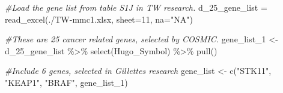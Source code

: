 \documentclass[
]{article}
\newenvironment{Shaded}{\begin{snugshade}}{\end{snugshade}}
\newcommand{\AttributeTok}[1]{\textcolor[rgb]{0.77,0.63,0.00}{#1}}
\newcommand{\CommentTok}[1]{\textcolor[rgb]{0.56,0.35,0.01}{\textit{#1}}}
\newcommand{\DecValTok}[1]{\textcolor[rgb]{0.00,0.00,0.81}{#1}}
\newcommand{\FunctionTok}[1]{\textcolor[rgb]{0.00,0.00,0.00}{#1}}
\newcommand{\NormalTok}[1]{#1}
\newcommand{\OtherTok}[1]{\textcolor[rgb]{0.56,0.35,0.01}{#1}}
\newcommand{\SpecialCharTok}[1]{\textcolor[rgb]{0.00,0.00,0.00}{#1}}
\newcommand{\StringTok}[1]{\textcolor[rgb]{0.31,0.60,0.02}{#1}}
\begin{document}
\begin{Shaded}
\begin{Highlighting}[]
\CommentTok{\#Load the gene list from table S1J in TW research.}
\NormalTok{d\_25\_gene\_list }\OtherTok{=} \FunctionTok{read\_excel}\NormalTok{(}\StringTok{\textquotesingle{}./TW{-}mmc1.xlsx\textquotesingle{}}\NormalTok{, }\AttributeTok{sheet=}\DecValTok{11}\NormalTok{, }\AttributeTok{na=}\StringTok{"NA"}\NormalTok{)}

\CommentTok{\#These are 25 cancer related genes, selected by COSMIC. }
\NormalTok{gene\_list\_1 }\OtherTok{\textless{}{-}}\NormalTok{ d\_25\_gene\_list }\SpecialCharTok{\%\textgreater{}\%} 
  \FunctionTok{select}\NormalTok{(Hugo\_Symbol) }\SpecialCharTok{\%\textgreater{}\%} 
  \FunctionTok{pull}\NormalTok{()}

\CommentTok{\#Include 6 genes, selected in Gillette\textquotesingle{}s research}
\NormalTok{gene\_list }\OtherTok{\textless{}{-}} \FunctionTok{c}\NormalTok{(}\StringTok{"STK11"}\NormalTok{, }\StringTok{"KEAP1"}\NormalTok{, }\StringTok{"BRAF"}\NormalTok{, gene\_list\_1)}


\end{Highlighting}
\end{Shaded}
\end{document}
